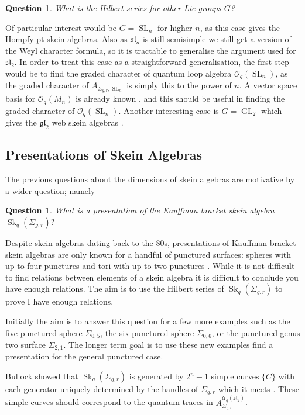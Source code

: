 \documentclass{article}
\newcommand{\Sk}{\operatorname{Sk}}
\newcommand{\SL}{\operatorname{SL}}
\newcommand{\GL}{\operatorname{GL}}
\newcommand{\gl}{\mathfrak{gl}}
\newcommand{\slgroup}{\mathfrak{sl}}
\newtheorem{qs}[thm]{Question}
\begin{document}
\begin{qs}
What is the Hilbert series for other Lie groups $G$?
\end{qs}

Of particular interest would be $G = \SL_n$ for higher $n$, as this case gives the Hompfy-pt skein algebras. Also as $\slgroup_n$ is still semisimple we still get a version of the Weyl character formula, so it is tractable to generalise the argument used for $\slgroup_2$. In order to treat this case as a straightforward generalisation, the first step would be to find the graded character of quantum loop algebra $\mathscr{O}_q(\SL_n)$, as the graded character of $A_{\Sigma_{g,r}, \SL_n}$ is simply this to the power of $n$. A vector space basis for $\mathscr{O}_q(M_n)$ is already known \cite{DomokosLenagan05}, and this should be useful in finding the graded character of $\mathscr{O}_q(\SL_n)$.
Another interesting case is $G = \GL_2$ which gives the $\gl_2$ web skein algebras \cite{QueffelecWedrich18}.

\subsection{Presentations of Skein Algebras}

The previous questions about the dimensions of skein algebras are motivative by a wider question; namely

\begin{qs}
What is a presentation of the Kauffman bracket skein algebra $\Sk_q(\Sigma_{g,r})?$
\end{qs} 

Despite skein algebras dating back to the 80s, presentations of Kauffman bracket skein algebras are only known for a handful of punctured surfaces: spheres with up to four punctures and tori with up to two punctures \cite{BullockPrzytycki00}. While it is not difficult to find relations between elements of a skein algebra it is difficult to conclude you have enough relations. The aim is to use the Hilbert series of $\Sk_q(\Sigma_{g,r})$ to prove I have enough relations.

Initially the aim is to answer this question for a few more examples such as the five punctured sphere $\Sigma_{0,5}$, the six punctured sphere $\Sigma_{0,6}$, or the punctured genus two surface $\Sigma_{2,1}$. The longer term goal is to use these new examples find a presentation for the general punctured case.

Bullock showed that $\Sk_q(\Sigma_{g,r})$ is generated by $2^n-1$ simple curves $ \{C\}$ with each generator uniquely determined by the handles of $\Sigma_{g,r}$ which it meets \cite{Bullock1999}. These simple curves should correspond to the quantum traces in $A_{\Sigma_{g,r}}^{\mathcal{U}_q(\slgroup_2)}$. 
\end{document}
